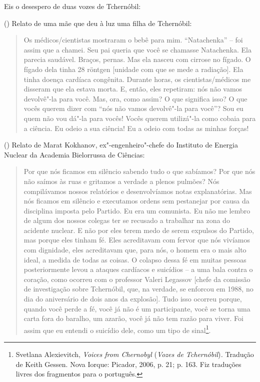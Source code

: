Eis o desespero de duas vozes de Tchernóbil:

() Relato de uma mãe que deu à luz uma filha de Tchernóbil:

\begin{quote}
Os médicos/cientistas mostraram o bebê para mim. ``Natachenka'' -- foi
assim que a chamei. Seu pai queria que você se chamasse Natachenka. Ela
parecia saudável. Braços, pernas. Mas ela nasceu com cirrose no fígado.
O fígado dela tinha 28 röntgen {[}unidade com que se mede a radiação{]}.
Ela tinha doença cardíaca congênita. Durante horas, os
cientistas/médicos me disseram que ela estava morta. E, então, eles
repetiram: nós não vamos devolvê"-la para você. Mas, ora, como assim? O
que significa isso? O que vocês querem dizer com ``nós não vamos
devolvê"-la para você''? Sou eu quem não vou dá"-la para vocês! Vocês
querem utilizá"-la como cobaia para a ciência. Eu odeio a sua ciência! Eu
a odeio com todas as minhas forças!
\end{quote}

() Relato de Marat Kokhanov, ex"-engenheiro"-chefe do Instituto
de Energia Nuclear da Academia Bielorrussa de Ciências:

\begin{quote}
Por que nós ficamos em silêncio sabendo tudo o que sabíamos? Por que nós
não saímos às ruas e gritamos a verdade a plenos pulmões? Nós
compilávamos nossos relatórios e desenvolvíamos notas explanatórias. Mas
nós ficamos em silêncio e executamos ordens sem pestanejar por causa da
disciplina imposta pelo Partido. Eu era um comunista. Eu não me lembro
de algum dos nossos colegas ter se recusado a trabalhar na zona do
acidente nuclear. E não por eles terem medo de serem expulsos do
Partido, mas porque eles tinham fé. Eles acreditavam com fervor que nós
vivíamos com dignidade, eles acreditavam que, para nós, o homem era o
mais alto ideal, a medida de todas as coisas. O colapso dessa fé em
muitas pessoas posteriormente levou a ataques cardíacos e suicídios -- a
uma bala contra o coração, como ocorreu com o professor Valeri Legassov
{[}chefe da comissão de investigação sobre Tchernóbil, que, na verdade,
se enforcou em 1988, no dia do aniversário de dois anos da explosão{]}.
Tudo isso ocorreu porque, quando você perde a fé, você já não é um
participante, você se torna uma carta fora do baralho, um azarão, você
já não tem razão para viver. Foi assim que eu entendi o suicídio dele,
como um tipo de sinal\footnote{Svetlana Alexievitch, \emph{Voices from
  Chernobyl} (\emph{Vozes de Tchernóbil})\emph{.} Tradução de Keith
  Gessen. Nova Iorque: Picador, 2006, p. 21; p. 163. Fiz traduções
  livres dos fragmentos para o português.}.
\end{quote}

